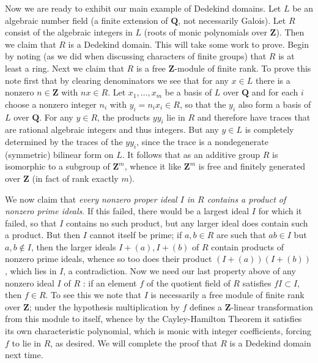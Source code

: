 \documentclass[10pt]{article}
\begin{document}
Now we are ready to exhibit our main example of Dedekind domains. Let
$L$ be an algebraic number field (a finite extension of $\mathbf Q$, not
necessarily Galois). Let $R$ consist of the algebraic integers in $L$
(roots of monic polynomials over $\mathbf Z$). Then we claim that $R$ is
a Dedekind domain. This will take some work to prove. Begin by noting
(as we did when discussing characters of finite groups) that $R$ is at
least a ring. Next we claim that $R$ is a free $\mathbf Z$-module of
finite rank. To prove this note first that by clearing denominators we
see that for any $x\in L$ there is a nonzero $n\in\mathbf Z$ with $nx\in
R$. Let $x_1,\ldots,x_m$ be a basis of $L$ over $\mathbf Q$ and for each
$i$ choose a nonzero integer $n_i$ with $y_i = n_i x_i\in R$, so that
the $y_i$ also form a basis of $L$ over $\mathbf Q$. For any $y\in R$,
the products $yy_i$ lie in $R$ and therefore have traces that are
rational algebraic integers and thus integers. But any $y\in L$ is
completely determined by the traces of the $yy_i$, since the trace is a
nondegenerate (symmetric) bilinear form on $L$. It follows that as an
additive group $R$ is isomorphic to a subgroup of $\mathbf Z^m$, whence
it like $\mathbf Z^m$ is free and finitely generated over $\mathbf Z$
(in fact of rank exactly $m$).

We now claim that {\sl every nonzero proper ideal $I$ in $R$ contains a
  product of nonzero prime ideals}. If this failed, there would be a
largest ideal $I$ for which it failed, so that $I$ contains no such
product, but any larger ideal does contain such a product. But then $I$
cannot itself be prime; if $a,b\in R$ are such that $ab\in I$ but
$a,b\notin I$, then the larger ideals $I+(a),I+(b)$ of $R$ contain
products of nonzero prime ideals, whence so too does their product
$(I+(a))(I+(b))$, which lies in $I$, a contradiction. Now we need our
last property above of any nonzero ideal $I$ of $R$ : if an element $f$
of the quotient field of $R$ satisfies $fI\subset I$, then $f\in R$. To
see this we note that $I$ is necessarily a free module of finite rank
over $\mathbf Z$; under the hypothesis multiplication by $f$ defines a
$\mathbf Z$-linear transformation from this module to itself, whence by
the Cayley-Hamilton Theorem it satisfies its own characteristic
polynomial, which is monic with integer coefficients, forcing $f$ to lie
in $R$, as desired. We will complete the proof that $R$ is a Dedekind
domain next time.
\end{document}
